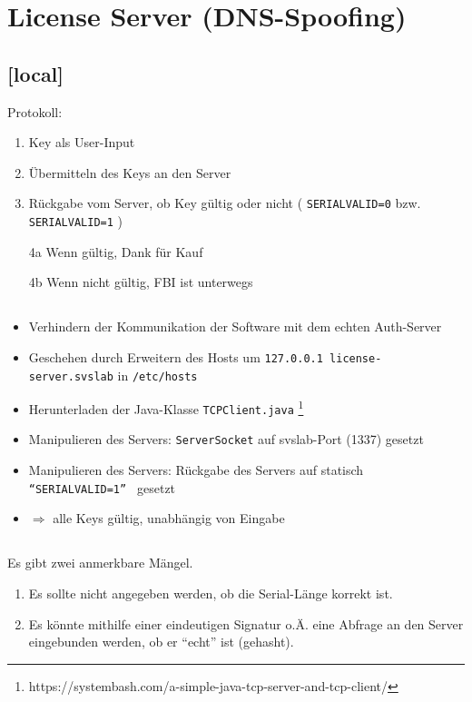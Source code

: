 \documentclass[twoside]{article}
\newcommand{\say}[1]{%
	``#1''%
}
\newcommand{\ttt}[1]{%
	\texttt{#1}%
}
\begin{document}
\section{License Server (DNS-Spoofing)}
\subsection{[local]}
Protokoll:
\begin{enumerate}
	\item Key als User-Input
	\item Übermitteln des Keys an den Server
	\item Rückgabe vom Server, ob Key gültig oder nicht (\ttt{SERIAL\textunderscore VALID=0} bzw. \ttt{SERIAL\textunderscore VALID=1})
	\item[4a] Wenn gültig, Dank für Kauf
	\item[4b] Wenn nicht gültig, FBI ist unterwegs
\end{enumerate}
\subsection{}
\begin{itemize}
	\item Verhindern der Kommunikation der Software mit dem echten Auth-Server
	\item Geschehen durch Erweitern des Hosts um \ttt{127.0.0.1    license-server.svslab} in \ttt{/etc/hosts}
	\item Herunterladen der Java-Klasse \ttt{TCPClient.java}\footnote{https://systembash.com/a-simple-java-tcp-server-and-tcp-client/}
	\item Manipulieren des Servers: \ttt{ServerSocket} auf svslab-Port (1337) gesetzt
	\item Manipulieren des Servers: Rückgabe des Servers auf statisch \ttt{\say{SERIAL\textunderscore VALID=1}} gesetzt
	\item $\Longrightarrow$ alle Keys gültig, unabhängig von Eingabe
\end{itemize} 
\subsection{}
Es gibt zwei anmerkbare Mängel.
\begin{enumerate}
	\item Es sollte nicht angegeben werden, ob die Serial-Länge korrekt ist.
	\item Es könnte mithilfe einer eindeutigen Signatur o.Ä. eine Abfrage an den Server eingebunden werden, ob er \say{echt} ist (gehasht).
\end{enumerate}
\end{document}
